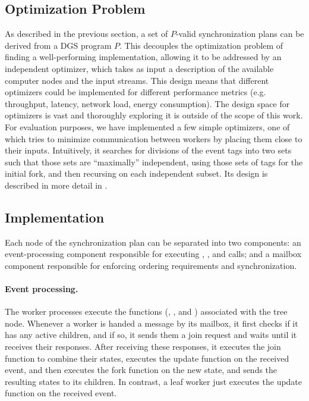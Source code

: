 \subsection{Optimization Problem}
\label{dgs:ssec:optimization-problem}

As described in the previous section, a set of $P$-valid synchronization
plans can be derived from a DGS program $P$. This decouples
the optimization problem of finding a well-performing implementation,
allowing it to be addressed by an independent optimizer,
which takes as input a
description of the available computer nodes and the input streams. This
design means that different optimizers could be implemented for
different performance metrics (e.g. throughput, latency, network load,
energy consumption).
The design space for optimizers is vast and thoroughly exploring it is outside of the scope of this work. For evaluation purposes, we have implemented a few simple optimizers, one of which tries to minimize communication between workers by placing them close to their inputs. Intuitively, it searches for divisions of the event tags into two sets such that those sets are ``maximally'' independent, using those sets of tags for the initial fork, and then recursing on each independent subset.
Its design is described in more detail in .

\subsection{Implementation}
\label{dgs:ssec:runtime}

Each node of the synchronization plan can be separated into two
components: an event-processing component
responsible for
executing ,
, and  calls; and a mailbox
component responsible for enforcing ordering requirements and
synchronization.

\paragraph{Event processing.}
The worker processes execute the functions (,
, and ) associated
with the tree node.  Whenever a worker is handed a message
by its mailbox, it first checks if it has any active children, and if
so, it sends them a join request and waits until it receives their
responses. After receiving these responses, it executes the join
function to combine their states, executes the update function on the
received event, and then executes the fork function on the new state,
and sends the resulting states to its children. In contrast, a leaf
worker just executes the update function on the received
event.

